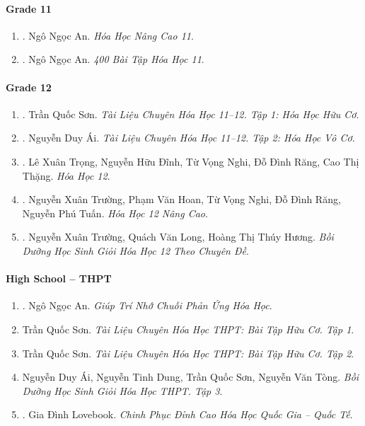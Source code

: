 \documentclass{article}
\begin{document}
\paragraph{Grade 11}

\begin{enumerate}
	\item \cite{An_Hoa_Hoc_nang_cao_11}. Ngô Ngọc An. {\it Hóa Học Nâng Cao 11}.\hfill{\sf[reading]}
	\item \cite{An_400_BT_Hoa_Hoc_11}. Ngô Ngọc An. {\it 400 Bài Tập Hóa Học 11}.\hfill{\sf[reading]}
\end{enumerate}

\paragraph{Grade 12}

\begin{enumerate}	
	\item \cite{Son2021}. Trần Quốc Sơn. {\it Tài Liệu Chuyên Hóa Học 11--12. Tập 1: Hóa Học Hữu Cơ}.\hfill{\sf[reading]}
	\item \cite{Ai2022}. Nguyễn Duy Ái. {\it Tài Liệu Chuyên Hóa Học 11--12. Tập 2: Hóa Học Vô Cơ}.\hfill{\sf[reading]}
	\item \cite{SGK_Hoa_Hoc_12_co_ban}. Lê Xuân Trọng, Nguyễn Hữu Đĩnh, Từ Vọng Nghi, Đỗ Đình Răng, Cao Thị Thặng. {\it Hóa Học 12}.\hfill{\sf[reading]}
	\item \cite{SGK_Hoa_Hoc_12_nang_cao}. Nguyễn Xuân Trường, Phạm Văn Hoan, Từ Vọng Nghi, Đỗ Đình Răng, Nguyễn Phú Tuấn. {\it Hóa Học 12 Nâng Cao}.
	\item \cite{Truong_Long_Huong_bdhsg_Hoa_Hoc_12}. Nguyễn Xuân Trường, Quách Văn Long, Hoàng Thị Thúy Hương. {\it Bồi Dưỡng Học Sinh Giỏi Hóa Học 12 Theo Chuyên Đề}.\hfill{\sf[reading]}
\end{enumerate}

\paragraph{High School -- THPT}

\begin{enumerate}
	\item \cite{An_chuoi_PUHH}. Ngô Ngọc An. {\it Giúp Trí Nhớ Chuỗi Phản Ứng Hóa Học}.\hfill{\sf[reading]}
	\item Trần Quốc Sơn. {\it Tài Liệu Chuyên Hóa Học THPT: Bài Tập Hữu Cơ. Tập 1}.
	\item Trần Quốc Sơn. {\it Tài Liệu Chuyên Hóa Học THPT: Bài Tập Hữu Cơ. Tập 2}.
	\item Nguyễn Duy Ái, Nguyễn Tinh Dung, Trần Quốc Sơn, Nguyễn Văn Tòng. {\it Bồi Dưỡng Học Sinh Giỏi Hóa Học THPT. Tập 3}.
	\item \cite{Lovebook2022}. Gia Đình Lovebook. {\it Chinh Phục Đỉnh Cao Hóa Học Quốc Gia -- Quốc Tế}.\hfill{\sf[reading]}
\end{enumerate}
\end{document}
